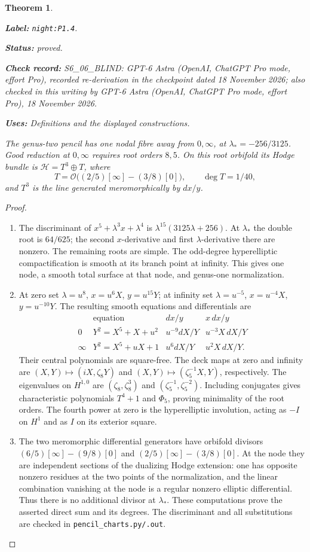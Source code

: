 \documentclass[11pt,a4paper]{article}
\newtheorem{theorem}{Theorem}[section]
\theoremstyle{definition}
\newcommand{\StatementRecord}[4]{\par\smallskip\begingroup\upshape\raggedright\noindent\textbf{Label:} \nolinkurl{#1}.\par\noindent\textbf{Status:} #2.\par\noindent\textbf{Check record:} #3.\par\noindent\textbf{Uses:} #4.\par\endgroup\smallskip}
\newcommand{\CurrentChecker}{GPT-6 Astra (OpenAI, ChatGPT Pro mode, effort Pro), 18 November 2026}
\begin{document}
\begin{theorem}\label{night:P1.4}
\StatementRecord{night:P1.4}{proved}{S6\_06\_BLIND: GPT-6 Astra (OpenAI, ChatGPT Pro mode, effort Pro), recorded re-derivation in the checkpoint dated 18 November 2026; also checked in this writing by \CurrentChecker}{Definitions and the displayed constructions}
The genus-two pencil has one nodal fibre away from $0,\infty$, at
$\lambda_*=-256/3125$.  Good reduction at $0,\infty$ requires root
orders $8,5$.  On this root orbifold its Hodge bundle is
$\mathcal H=T^3\oplus T$, where
\[
T=\mathcal O\bigl((2/5)[\infty]-(3/8)[0]\bigr),\qquad
\deg T=1/40,
\]
and $T^3$ is the line generated meromorphically by $dx/y$.
\end{theorem}
\begin{proof}
\begin{enumerate}[label=\arabic*.]
\item The discriminant of $x^5+\lambda^3x+\lambda^4$ is
$\lambda^{15}(3125\lambda+256)$.
At $\lambda_*$ the double root is $64/625$;
the second $x$-derivative and first $\lambda$-derivative there are
nonzero.  The remaining roots are simple.  The odd-degree
hyperelliptic compactification is smooth at its branch point at
infinity.  This gives one node, a smooth total surface at that node,
and genus-one normalization.

\item At zero set $\lambda=u^8$, $x=u^6X$, $y=u^{15}Y$; at infinity set
$\lambda=u^{-5}$, $x=u^{-4}X$, $y=u^{-10}Y$.
The resulting smooth equations and differentials are
\[
\begin{array}{c|c|c|c}
 &\text{equation}&dx/y&x\,dx/y\\\hline
0&Y^2=X^5+X+u^2&u^{-9}dX/Y&u^{-3}X\,dX/Y\\
\infty&Y^2=X^5+uX+1&u^6dX/Y&u^2X\,dX/Y.
\end{array}
\]
Their central polynomials are square-free.  The deck maps at zero and
infinity are $(X,Y)\mapsto(iX,\zeta_8Y)$ and
$(X,Y)\mapsto(\zeta_5^{-1}X,Y)$, respectively.
The eigenvalues on $H^{1,0}$ are $(\zeta_8,\zeta_8^3)$ and
$(\zeta_5^{-1},\zeta_5^{-2})$.  Including conjugates gives characteristic
polynomials $T^4+1$ and $\Phi_5$, proving minimality of the root orders.
The fourth power at zero is the hyperelliptic involution, acting as
$-I$ on $H^1$ and as $I$ on its exterior square.

\item The two meromorphic differential generators have orbifold divisors
$(6/5)[\infty]-(9/8)[0]$ and
$(2/5)[\infty]-(3/8)[0]$.
At the node they are independent sections of the dualizing Hodge
extension: one has opposite nonzero residues at the two points of the
normalization, and the linear combination vanishing at the node is a
regular nonzero elliptic differential.  Thus there is no additional
divisor at $\lambda_*$.  These computations prove the asserted direct
sum and its degrees.  The discriminant and all substitutions are
checked in \texttt{pencil\_charts.py/.out}.

\end{enumerate}
\end{proof}
\end{document}
